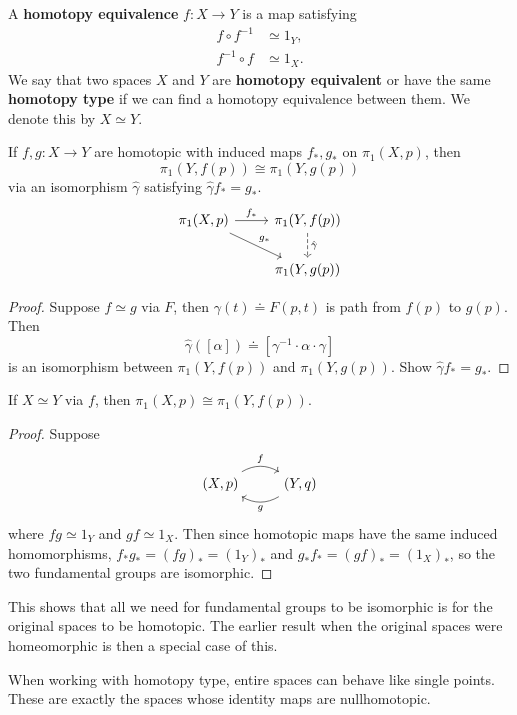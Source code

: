 \documentclass[twoside,10pt]{report}
\begin{document}
\begin{defn}[]
	A \textbf{homotopy equivalence} $f:X\to Y$ is a map satisfying
\begin{align*}
	f \circ f^{-1} &\simeq 1_{Y},\\
	f^{-1} \circ f &\simeq 1_{X}.
\end{align*}
We say that two spaces $X$ and $Y$ are \textbf{homotopy equivalent} or have the same \textbf{homotopy type} if we can find a homotopy equivalence between them. We denote this by $X \simeq Y$.
\end{defn}

\begin{prop}
	If $f,g:X\to Y$ are homotopic with induced maps $f_{*},g_{*}$ on $\pi_1(X,p)$, then
	\[
		\pi_1(Y,f(p)) \cong \pi_1(Y,g(p))
	\] via an isomorphism $\hat{\gamma}$ satisfying $\hat{\gamma}f_{*}=g_{*}$.
\[
\begin{tikzcd}
	\pi_1(X,p)\rar{f_{*}}\arrow[dr,"g_{*}"]&\pi_1(Y,f(p))\dar[dashed]{\hat{\gamma}}\\
			     &\pi_1(Y,g(p))
\end{tikzcd}
\] 
\end{prop}
\begin{proof}
	Suppose $f \simeq g$ via $F$, then $\gamma(t) \doteq F(p,t)$ is path from $f(p)$ to $g(p)$. Then
	\[
		\hat{\gamma}([\alpha]) \doteq [\gamma^{-1} \cdot \alpha \cdot \gamma]
	\] is an isomorphism between $\pi_1(Y,f(p))$ and $\pi_1(Y,g(p))$. {\color{red}Show $\hat{\gamma}f_{*}=g_{*}$.}
\end{proof}

\begin{prop}
	If $X \simeq Y$ via $f$, then $\pi_1(X,p)\cong \pi_1(Y,f(p))$.
\end{prop}
\begin{proof}
	Suppose
	\[
        \begin{tikzcd}
                (X,p)\arrow[r,"f",bend left]&(Y,q)\arrow[l,"g",bend left]
        \end{tikzcd}
        \]
	where $fg \simeq 1_{Y}$ and $gf \simeq 1_{X}$. Then since homotopic maps have the same induced homomorphisms, $f_{*}g_{*}=(fg)_{*}=(1_{Y})_{*}$ and $g_{*}f_{*}=(gf)_{*}=(1_{X})_{*}$, so the two fundamental groups are isomorphic.
\end{proof}
This shows that all we need for fundamental groups to be isomorphic is for the original spaces to be homotopic. The earlier result when the original spaces were homeomorphic is then a special case of this.

When working with homotopy type, entire spaces can behave like single points. These are exactly the spaces whose identity maps are nullhomotopic.
\end{document}
